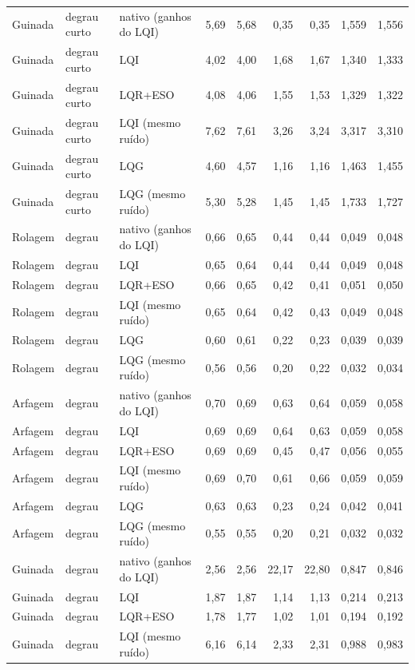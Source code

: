 \begin{longtable}{lllrrrrrr}
Guinada & degrau curto & nativo (ganhos do LQI) & 5,69 & 5,68 & 0,35 & 0,35 & 1,559 & 1,556 \\
Guinada & degrau curto & LQI & 4,02 & 4,00 & 1,68 & 1,67 & 1,340 & 1,333 \\
Guinada & degrau curto & LQR+ESO & 4,08 & 4,06 & 1,55 & 1,53 & 1,329 & 1,322 \\
Guinada & degrau curto & LQI (mesmo ruído) & 7,62 & 7,61 & 3,26 & 3,24 & 3,317 & 3,310 \\
Guinada & degrau curto & LQG & 4,60 & 4,57 & 1,16 & 1,16 & 1,463 & 1,455 \\
Guinada & degrau curto & LQG (mesmo ruído) & 5,30 & 5,28 & 1,45 & 1,45 & 1,733 & 1,727 \\
Rolagem & degrau & nativo (ganhos do LQI) & 0,66 & 0,65 & 0,44 & 0,44 & 0,049 & 0,048 \\
Rolagem & degrau & LQI & 0,65 & 0,64 & 0,44 & 0,44 & 0,049 & 0,048 \\
Rolagem & degrau & LQR+ESO & 0,66 & 0,65 & 0,42 & 0,41 & 0,051 & 0,050 \\
Rolagem & degrau & LQI (mesmo ruído) & 0,65 & 0,64 & 0,42 & 0,43 & 0,049 & 0,048 \\
Rolagem & degrau & LQG & 0,60 & 0,61 & 0,22 & 0,23 & 0,039 & 0,039 \\
Rolagem & degrau & LQG (mesmo ruído) & 0,56 & 0,56 & 0,20 & 0,22 & 0,032 & 0,034 \\
Arfagem & degrau & nativo (ganhos do LQI) & 0,70 & 0,69 & 0,63 & 0,64 & 0,059 & 0,058 \\
Arfagem & degrau & LQI & 0,69 & 0,69 & 0,64 & 0,63 & 0,059 & 0,058 \\
Arfagem & degrau & LQR+ESO & 0,69 & 0,69 & 0,45 & 0,47 & 0,056 & 0,055 \\
Arfagem & degrau & LQI (mesmo ruído) & 0,69 & 0,70 & 0,61 & 0,66 & 0,059 & 0,059 \\
Arfagem & degrau & LQG & 0,63 & 0,63 & 0,23 & 0,24 & 0,042 & 0,041 \\
Arfagem & degrau & LQG (mesmo ruído) & 0,55 & 0,55 & 0,20 & 0,21 & 0,032 & 0,032 \\
Guinada & degrau & nativo (ganhos do LQI) & 2,56 & 2,56 & 22,17 & 22,80 & 0,847 & 0,846 \\
Guinada & degrau & LQI & 1,87 & 1,87 & 1,14 & 1,13 & 0,214 & 0,213 \\
Guinada & degrau & LQR+ESO & 1,78 & 1,77 & 1,02 & 1,01 & 0,194 & 0,192 \\
Guinada & degrau & LQI (mesmo ruído) & 6,16 & 6,14 & 2,33 & 2,31 & 0,988 & 0,983 \\

\end{longtable}
